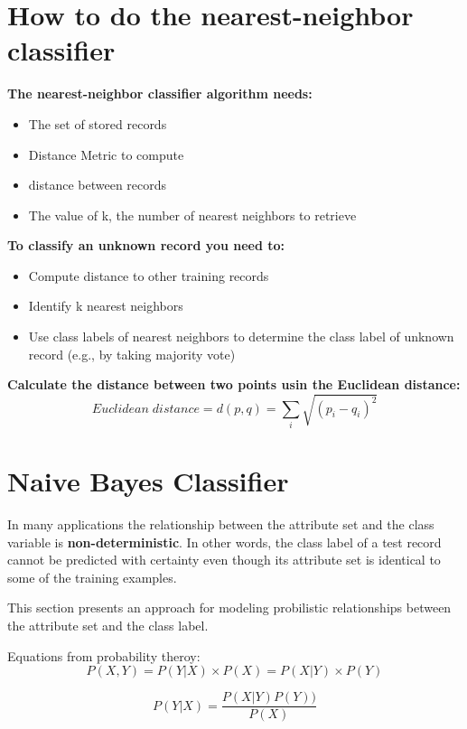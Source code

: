 		\section{How to do the nearest-neighbor classifier}
		{\bf The nearest-neighbor classifier algorithm needs:}
			\begin{itemize}
				\item The set of stored records 
				\item Distance Metric to compute 
				\item distance between records
				\item The value of k, the number of nearest neighbors to retrieve 
			\end{itemize}
		{\bf To classify an unknown record you need to:}
			\begin{itemize}
				\item Compute distance to other training records
				\item Identify k nearest neighbors 
				\item Use class labels of nearest neighbors to determine the class 
				label of unknown record (e.g., by taking majority vote)
			\end{itemize}

		{\bf Calculate the distance between two points usin the Euclidean distance:}
		\begin{equation}
			Euclidean\;distance = d(p,q) = \sum_{i}^{} \sqrt{(p_{i} - q_{i})^{2}}
		\end{equation}

		\clearpage
	\section{Naive Bayes Classifier}

		In many applications the relationship between the attribute set and the class
		variable is {\bf non-deterministic}. In other words, the class label of a test
		record cannot be predicted with certainty even though its attribute set is 
		identical to some of the training examples. 

		This section presents an approach for modeling probilistic relationships
		between the attribute set and the class label. 

		Equations from probability theroy:
		\begin{equation}
			P(X,Y) = P(Y|X) \times P(X) = P(X|Y) \times P(Y)
		\end{equation}

		\begin{equation}
			P(Y|X) = \frac{P(X|Y)P(Y))}{P(X)}
		\end{equation}

